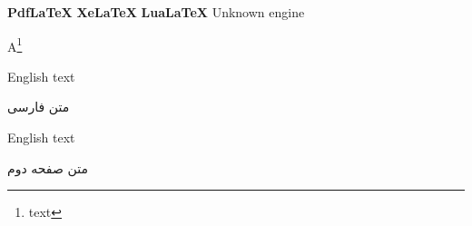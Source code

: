 \documentclass{article}
\begin{document}
    \begin{latin}
        \ifPDFTeX
        \textbf{PdfLaTeX}
        \else\ifXeTeX
        \textbf{XeLaTeX}
        \else\ifLuaTeX
        \textbf{LuaLaTeX}
        \else
        Unknown engine
        \fi\fi\fi
    \end{latin}

    A\footnote{text}

    English text

    متن فارسی

    English text

    \newpage

    متن صفحه دوم
\end{document}
